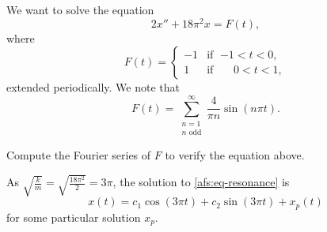 \begin{example}
We want to solve the equation
\begin{equation} \label{afs:eq-resonance}
2 x'' + 18 \pi^2 x = F(t) ,
\end{equation}
where
\begin{equation*}
F(t) =
\begin{cases}
-1 & \text{if } \; {-1} < t < 0 , \\
1 & \text{if } \; \phantom{-}0 < t < 1 ,
\end{cases}
\end{equation*}
extended periodically.  We note that
\begin{equation*}
F(t) =
\sum_{\substack{n=1 \\ n \text{ odd}}}^\infty
\frac{4}{\pi n}
\sin (n \pi t) . 
\end{equation*}

\begin{exercise}
Compute the Fourier series of $F$ to verify the equation above.
\end{exercise}

As $\sqrt{\frac{k}{m}} = \sqrt{\frac{18\pi^2}{2}} = 3\pi$,
the solution to \eqref{afs:eq-resonance} is
\begin{equation*}
x(t) = c_1 \cos  (3\pi t) + c_2 \sin (3\pi t) + x_p (t)
\end{equation*}
for some particular solution $x_p$.


\end{example}
